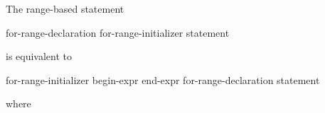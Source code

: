 \pnum
The range-based  statement
\begin{ncsimplebnf}
 \terminal{(}  for-range-declaration \terminal{:} for-range-initializer \terminal{)} statement
\end{ncsimplebnf}
is equivalent to
\begin{ncsimplebnf}
\terminal{\{}\br
\bnfindent {}\br
\bnfindent {} \terminal{\&\&} \terminal{=} for-range-initializer \terminal{;}\br
\bnfindent {}  \terminal{=} begin-expr \terminal{;}\br
\bnfindent {}  \terminal{=} end-expr \terminal{;}\br
\bnfindent {} \terminal{(} \terminal{;}  \terminal{!=} \terminal{;} \terminal{++} \terminal{)} \terminal{\{}\br
\bnfindent\bnfindent for-range-declaration \terminal{=} \terminal{*}  \terminal{;}\br
\bnfindent\bnfindent statement\br
\bnfindent \terminal{\}}\br
\terminal{\}}
\end{ncsimplebnf}
where

